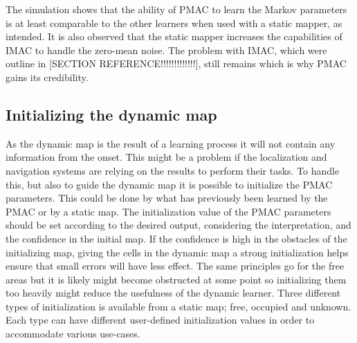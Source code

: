 The simulation shows that the ability of PMAC to learn the Markov parameters is at least comparable to the other learners when used with a static mapper, as intended. It is also observed that the static mapper increases the capabilities of IMAC to handle the zero-mean noise. The problem with IMAC, which were outline in [SECTION REFERENCE!!!!!!!!!!!!!], still remains which is why PMAC gains its credibility. 


\subsection{Initializing the dynamic map}
As the dynamic map is the result of a learning process it will not contain any information from the onset. 
This might be a problem if the localization and navigation systems are relying on the results to perform their tasks.
To handle this, but also to guide the dynamic map it is possible to initialize the PMAC parameters. 
This could be done by what has previously been learned by the PMAC or by a static map.
The initialization value of the PMAC parameters should be set according to the desired output, considering the interpretation, and  the confidence in the initial map.
If the confidence is high in the obstacles of the initializing map, giving the cells in the dynamic map a strong initialization helps ensure that small errors will have less effect. 
The same principles go for the free areas but it is likely might become obstructed at some point so initializing them too heavily might reduce the usefulness of the dynamic learner.
Three different types of initialization is available from a static map; free, occupied and unknown.
Each type can have different user-defined initialization values in order to accommodate various use-cases.  
